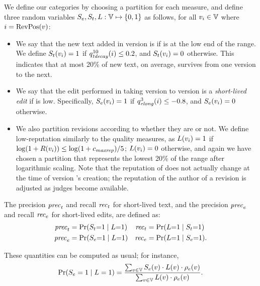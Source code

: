 We define our categories by choosing a partition for each measure,
and define three random variables $S_e, S_t, L: \versions{}
\mapsto \set{0,1}$ as follows,
for all $\version{i} \in \versions{}$ where $i = \mathrm{RevPos}(v)$:
\begin{itemize} 
\item We say that the new text added in version 
  is  if  is at
  the low end of the range.
  We define $S_t(v_{i})=1$ if $\quality{tdecay}{10}{i} \leq  0.2$,
  and $S_t(v_{i})=0$ otherwise.
  This indicates that at most 20\% of new text, on
  average, survives from one version to the next. 

\item We say that the edit performed in taking version
   to version 
  is a \textit{short-lived edit} if
   is low.
  Specifically, $S_e(v_{i})=1$ if $\quality{elong}{3}{i} \leq -0.8$,
  and $S_e(v_{i})=0$ otherwise.

\item We also partition revisions according to whether
  they are  or not.
  We define low-reputation similarly to the quality measures,
  as $L(v_{i})=1$ if
  $\log (1+R(v_{i})) \leq \log(1+{c_{{\text{\textit{maxrep}}}}}) / 5$;
  $L(v_{i})=0$ otherwise, and again we have chosen a
  partition that represents the lowest 20\% of the range
  after logarithmic scaling.
  Note that the reputation of  does not actually
  change at the time of version 's creation; the reputation
  of the author of a revision
  is adjusted as judges become available.

\end{itemize}
%
The precision ${\text{\textit{prec}}}_t$ and recall ${\text{\textit{rec}}}_t$
for short-lived text, and 
the precision ${\text{\textit{prec}}}_e$ and recall ${\text{\textit{rec}}}_e$
for short-lived edits, are defined as:
%
\begin{align*}
    {\text{\textit{prec}}}_t & = \textstyle\Pr(S_t{=}1 \mid L{=}1) 
  & {\text{\textit{rec}}}_t & = \textstyle\Pr(L{=}1 \mid S_t{=}1) \\
    {\text{\textit{prec}}}_e & = \textstyle\Pr(S_e{=}1 \mid L{=}1) 
  & {\text{\textit{rec}}}_e & = \textstyle\Pr(L{=}1 \mid S_e{=}1).
\end{align*}
\begin{comment}
\ifshort
For short-lived text, the {\em precision\/} is 
$
  \textstyle \prect = \Pr(S_t=1 \mid L=1)
$,
and the {\em recall\/} is 
$
  \textstyle \recallt = \Pr(L=1 \mid S_t=1)
$.
Similarly, for short-lived edits, we define the 
precision is $\prece = \Pr(S_e=1 \mid L=1)$, 
and the recall is $\recalle = \Pr(L=1 \mid S_e=1)$.
\fi
\end{comment}
These quantities can be computed as usual; for instance, 
\begin{equation*}
  {\textstyle \Pr} (S_e=1 \mid L=1) = 
  \frac{\sum_{v \in \versions{}} S_e(v) \cdot L(v) \cdot \editmass(v)}{%
    \sum_{v \in \versions{}} L(v) \cdot \editmass(v)}.
\end{equation*}


